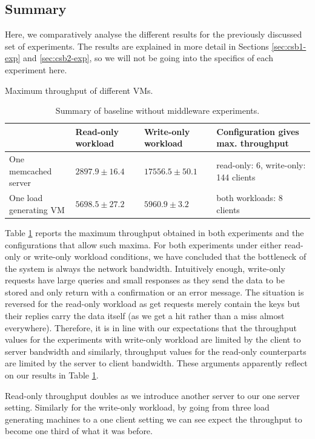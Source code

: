 \documentclass[11pt,a4paper]{article}
\begin{document}
\subsection{Summary} \label{sec:csb-summary}
Here, we comparatively analyse the different results for the previously discussed set of experiments. The results are explained in more detail in Sections \ref{sec:csb1-exp} and \ref{sec:csb2-exp}, so we will not be going into the specifics of each experiment here.
\begin{table}[h]
\small
\centering
{Maximum throughput of different VMs.}
\begin{tabular}{|l|p{2.1cm}|p{2.2cm}|p{6cm}|}
\hline 	                      & Read-only workload & Write-only workload & Configuration gives max. throughput \\ 
\hline One memcached server & $2897.9 \pm 16.4$ & $17556.5 \pm 50.1$ & read-only: 6, write-only: 144 clients \\ 
\hline One load generating VM & $5698.5 \pm 27.2$ & $5960.9 \pm 3.2$   & both workloads: 8 clients \\ 
\hline 
\end{tabular}
\caption{Summary of baseline without middleware experiments.} \label{tab:csb-summary}
\end{table}
\par Table \ref{tab:csb-summary} reports the maximum throughput obtained in both experiments and the configurations that allow such maxima. For both experiments under either read-only or write-only workload conditions, we have concluded that the bottleneck of the system is always the network bandwidth. Intuitively enough, write-only requests have large queries and small responses as they send the data to be stored and only return with a confirmation or an error message. The situation is reversed for the read-only workload as get requests merely contain the keys but their replies carry the data itself (as we get a hit rather than a miss almost everywhere). Therefore, it is in line with our expectations that the throughput values for the experiments with write-only workload are limited by the client to server bandwidth and similarly, throughput values for the read-only counterparts are limited by the server to client bandwidth. These arguments apparently reflect on our results in Table \ref{tab:csb-summary}. 
\par Read-only throughput doubles as we introduce another server to our one server setting. Similarly for the write-only workload, by going from three load generating machines to a one client setting we can see expect the throughput to become one third of what it was before.
\end{document}
